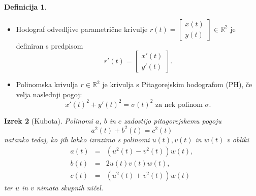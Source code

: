 \documentclass[12pt]{beamer}
\theoremstyle{definition} %
\newtheorem{definicija}{Definicija}[section]
\theoremstyle{plain} %
\newtheorem{izrek}[definicija]{Izrek}
\begin{document}
\begin{frame}
    
    \begin{definicija}
        \begin{itemize}
            \item Hodograf odvedljive parametrične krivulje $r (t) = \begin{bmatrix} x(t) \\ y(t) \end{bmatrix} \in \mathbb{R}^2$ je definiran s predpisom $$r'(t) = \begin{bmatrix} x'(t) \\ y'(t) \end{bmatrix}.$$
            \item  Polinomska krivulja $r \in \mathbb{R}^2$ je krivulja s Pitagorejskim hodografom (PH), če velja naslednji pogoj:
            $$x'(t)^2 + y'(t)^2 = \sigma(t)^2 \text{ za nek polinom } \sigma.$$
        \end{itemize} 
    \end{definicija}
\end{frame}

\begin{frame}
    \begin{izrek}[Kubota]
        Polinomi $a$, $b$ in $c$ zadostijo pitagorejskemu pogoju
        $$a^2(t) + b^2(t) = c^2(t)$$
        natanko tedaj, ko jih lahko izrazimo s polinomi $u(t), v(t)$ in $w(t)$ v obliki
        \begin{eqnarray}
            a(t) &=&(u^2(t) - v^2(t))w(t),\nonumber\\
            b(t) &=& 2u(t)v(t)w(t),\nonumber\\
            c(t) &=& (u^2(t) + v^2(t))w(t)\nonumber
        \end{eqnarray}
        ter $u$ in $v$ nimata skupnih ničel.
        
    \end{izrek}

\end{frame}
\end{document}

